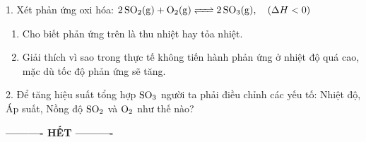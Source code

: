 \documentclass[11pt,a4paper]{article}
\begin{document}
1. Xét phản ứng oxi hóa: $\ce{2SO2(g) + O2(g) <=> 2SO3(g)},\quad (\Delta H < 0)$
\begin{enumerate}[label=\alph*),leftmargin=20pt,itemsep=0pt]
\item Cho biết phản ứng trên là thu nhiệt hay tỏa nhiệt.
\item Giải thích vì sao trong thực tế không tiến hành phản ứng ở nhiệt độ quá cao, mặc dù tốc độ phản ứng sẽ tăng.
\end{enumerate}
2. Để tăng hiệu suất tổng hợp $\ce{SO3}$ người ta phải điều chỉnh các yếu tố: Nhiệt độ, Áp suất, Nồng độ $\ce{SO2}$ và $\ce{O2}$ như thế nào?

\vspace{2pt}

\vspace{6pt}
\begin{center}
\textbf{\large ---------- HẾT ----------}
\end{center}
\end{document}
